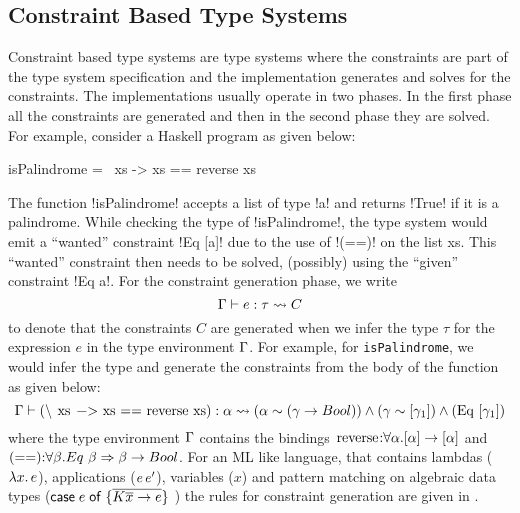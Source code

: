 \documentclass[manuscript,screen,nonacm]{acmart}
\begin{document}
\subsection{Constraint Based Type Systems}
Constraint based type systems are type systems where the constraints are part of the type system specification and the implementation generates and solves for the constraints. The implementations usually operate in two phases. In the first phase all the constraints are generated and then in the second phase they are solved. For example, consider a Haskell program as given below:
\begin{codef}
isPalindrome = \ xs -> xs == reverse xs
\end{codef}
The function !isPalindrome! accepts a list of type !a! and returns !True! if it is a palindrome. While checking the type of !isPalindrome!, the type system would emit a ``wanted'' constraint !Eq [a]! due to the use of !(==)! on the list xs. This ``wanted'' constraint then needs to be solved, (possibly) using the ``given'' constraint !Eq a!. For the constraint generation phase, we write
\newcommand\GenConstraints[4]{#1 \vdash #2 : #3 \rightsquigarrow #4}
$$
\GenConstraints \TEnv e \tau C
$$
to denote that the constraints $C$ are generated when we infer the type $\tau$ for the expression $e$ in the type environment $\Gamma$. For example, for \lstinline{isPalindrome}, we would infer the type and generate the constraints from the body of the function as given below:
$$
\TEnv \vdash \text{(\lstinline {\\ xs -> xs == reverse xs})} : \alpha \rightsquigarrow (\alpha \sim (\Co \to Bool)) \land (\Co \sim [\Co_1]) \land (\text{\lstinline{Eq}}~ [\Co_1])
$$
where the type environment $\Gamma$ contains the bindings $\text{\lstinline{reverse}}\co\forall \alpha. [\alpha] \to [\alpha]$ and $\text{\lstinline{(==)}}\co\forall \beta. Eq~\beta \then \beta \to Bool$.
For an ML like language, that contains lambdas ($\lambda x.\, e$), applications ($e \, e'$), variables ($x$) and pattern matching on algebraic data types ($\mathsf{case}\;e\;\mathsf{of}\;\{\overline{K \overline x \to e}\}$ ) the rules for constraint generation are given in .
\end{document}
